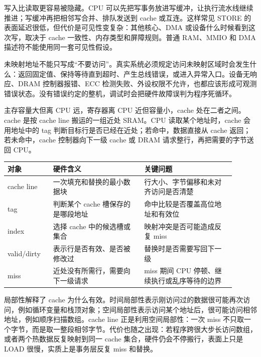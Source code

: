 
写入比读取更容易被隐藏。CPU 可以先把写事务放进写缓冲，让执行流水线继续推进；写缓冲再把相邻写合并、排队发送到 cache 或互连。这样常见 STORE 的表面延迟很低，但代价是可见性变复杂：其他核心、DMA 或设备什么时候看到这次写，取决于 cache 一致性、内存类型和屏障规则。普通 RAM、MMIO 和 DMA 描述符不能使用同一套可见性假设。

未映射地址不能只写成“不要访问”。真实系统必须规定访问未映射区域时会发生什么：返回固定值、保持等待直到超时、产生总线错误，或进入异常入口。设备无响应、DRAM 控制器报错、ECC 检测失败、外设权限不允许，也都应该形成可观测错误状态。没有错误约定的整机，调试时会把硬件故障误判为程序死循环。

主存容量大但离 CPU 远，寄存器离 CPU 近但容量小，cache 处在二者之间。cache 是按 cache line 搬运的一组近处 SRAM。CPU 读取某个地址时，cache 会用地址中的 tag 判断目标行是否已经在近处；若命中，数据直接从 cache 返回；若未命中，cache 控制器向下一级 cache 或 DRAM 请求整行，再把需要的字节送回 CPU。

\begin{longtable}{L{0.18\linewidth}L{0.36\linewidth}L{0.36\linewidth}}
\toprule
对象 & 硬件含义 & 关键问题 \\
\midrule
cache line & 一次填充和替换的最小数据块 & 行大小、字节偏移和未对齐访问是否清楚 \\\tablerowrule
tag & 判断某个 cache 槽保存的是哪段地址 & 命中比较是否覆盖高位地址和有效位 \\\tablerowrule
index & 选择 cache 中的候选槽或集合 & 映射冲突是否可能造成反复 miss \\\tablerowrule
valid/dirty & 表示行是否有效、是否被修改过 & 替换时是否需要写回下一级 \\\tablerowrule
miss & 近处没有所需行，需要向下一级请求 & miss 期间 CPU 停顿、继续执行或乱序等待的边界 \\
\bottomrule
\end{longtable}

局部性解释了 cache 为什么有效。时间局部性表示刚访问过的数据很可能再次访问，例如循环变量和栈顶对象；空间局部性表示访问某个地址后，很可能访问相邻地址，例如顺序扫描数组。cache line 正是利用空间局部性：一次 miss 不只取一个字节，而是取一整段相邻字节。代价也随之出现：若程序跨很大步长访问数组，或者两个热数据反复映射到同一 cache 集合，硬件仍会不停搬行，表面上只是 LOAD 很慢，实质上是事务层反复 miss 和替换。

